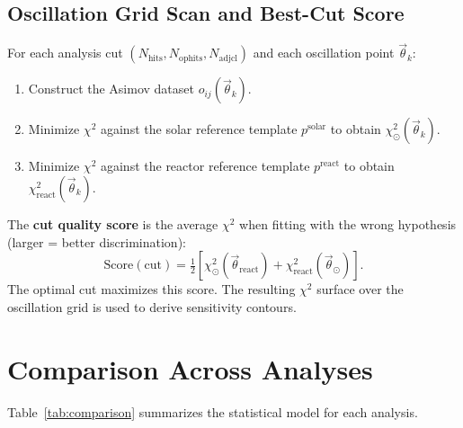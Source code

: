 \documentclass[12pt,a4paper]{article}
\begin{document}
\subsection{Oscillation Grid Scan and Best-Cut Score}
\label{sec:sens_scan}

For each analysis cut $(N_{\mathrm{hits}},N_{\mathrm{ophits}},N_{\mathrm{adjcl}})$
and each oscillation point $\vec{\theta}_k$:
\begin{enumerate}[leftmargin=*]
  \item Construct the Asimov dataset $o_{ij}(\vec{\theta}_k)$.
  \item Minimize $\chi^2$ against the solar reference template $p^{\mathrm{solar}}$
    to obtain $\chi^2_{\odot}(\vec{\theta}_k)$.
  \item Minimize $\chi^2$ against the reactor reference template $p^{\mathrm{react}}$
    to obtain $\chi^2_{\mathrm{react}}(\vec{\theta}_k)$.
\end{enumerate}

The \textbf{cut quality score} is the average $\chi^2$ when fitting with the
wrong hypothesis (larger = better discrimination):
\begin{equation}
  \mathrm{Score}(\mathrm{cut}) =
    \tfrac{1}{2}\!\left[
      \chi^2_{\odot}(\vec{\theta}_{\mathrm{react}})
      + \chi^2_{\mathrm{react}}(\vec{\theta}_{\odot})
    \right].
  \label{eq:sens_score}
\end{equation}
The optimal cut maximizes this score.  The resulting $\chi^2$ surface over
the oscillation grid is used to derive sensitivity contours.

\section{Comparison Across Analyses}
\label{sec:comparison}

Table~\ref{tab:comparison} summarizes the statistical model for each analysis.
\end{document}
